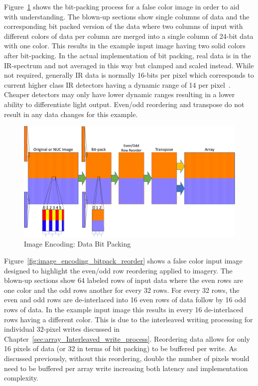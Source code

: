     Figure~\ref{fig:image_encoding_bitback} shows the bit-packing process for a false color image in order to aid with understanding. The blown-up sections show single columns of data and the corresponding bit packed version of the data where two columns of input with different colors of data per column are merged into a single column of 24-bit data with one color. This results in the example input image having two solid colors after bit-packing. In the actual implementation of bit packing, real data is in the IR-spectrum and not averaged in this way but clamped and scaled instead. While not required, generally IR data is normally 16-bits per pixel which corresponds to current higher class IR detectors having a dynamic range of 14 per pixel~\cite{FLIR2014_1, FLIR2014_2, FLIR2016}. Cheaper detectors may only have lower dynamic ranges resulting in a lower ability to differentiate light output. Even/odd reordering and transpose do not result in any data changes for this example.

    \begin{figure}
        \centering
        \includegraphics[width=1.0\textwidth]{fig/image_encoding_bitback.pdf}
        \caption{Image Encoding: Data Bit Packing}
        \label{fig:image_encoding_bitback}
    \end{figure}

    Figure~\ref{fig:image_encoding_bitpack_reorder} shows a false color input image designed to highlight the even/odd row reordering applied to imagery. The blown-up sections show 64 labeled rows of input data where the even rows are one color and the odd rows another for every 32 rows. For every 32 rows, the even and odd rows are de-interlaced into 16 even rows of data follow by 16 odd rows of data. In the example input image this results in every 16 de-interlaced rows having a different color. This is due to the interleaved writing processing for individual 32-pixel writes discussed in Chapter~\ref{sec:array_Interleaved_write_process}. Reordering data allows for only 16 pixels of data (or 32 in terms of bit packing) to be buffered per write. As discussed previously, without this reordering, double the number of pixels would need to be buffered per array write increasing both latency and implementation complexity.

